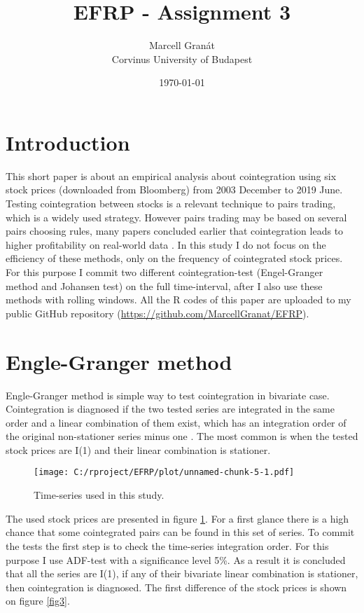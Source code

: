 \documentclass[12pt, a4paper, twoside, titlepage]{article}
\title{EFRP - Assignment 3}
\date{\today}
\author{Marcell Granát \\ Corvinus University of Budapest}
\begin{document}
  \maketitle
  \tableofcontents
  

\section{Introduction}
\setcounter{page}{1}

This short paper is about an empirical analysis about cointegration using six stock prices (downloaded from Bloomberg) from 2003 December to 2019 June. Testing cointegration between stocks is a relevant technique to pairs trading, which is a widely used strategy. However pairs trading may be based on several pairs choosing rules, many papers concluded earlier that cointegration leads to higher profitability on real-world data \cite{Huck.2014}.
In this study I do not focus on the efficiency of these methods, only on the frequency of cointegrated stock prices. For this purpose I commit two different cointegration-test (Engel-Granger method and Johansen test) on the full time-interval, after I also use these methods with rolling windows. All the R codes of this paper are uploaded to my public GitHub repository (\href{https://github.com/MarcellGranat/EFRP/blob/master/Exercise-3.md}{https://github.com/MarcellGranat/EFRP}). 

\section{Engle-Granger method}

Engle-Granger method is simple way to test cointegration in bivariate case. Cointegration is diagnosed if the two tested series are integrated in the same order and a linear combination of them exist, which has an integration order of the original non-stationer series minus one \cite{Kirchgassner.2007}.
The most common is when the tested stock prices are I(1) and their linear combination is stationer.

\begin{figure}[ht]
  \centering
  \texttt{[image: C:/rproject/EFRP/plot/unnamed-chunk-5-1.pdf]}
  \caption{Time-series used in this study.}
  \label{fig1}
\end{figure}

The used stock prices are presented in figure \ref{fig1}. For a first glance there is a high chance that some cointegrated pairs can be found in this set of series. To commit the tests the first step is to check the time-series integration order. For this purpose I use ADF-test with a significance level 5\%. As a result it is concluded that all the series are I(1), if any of their bivariate linear combination is stationer, then cointegration is diagnosed. The first difference of the stock prices is shown on figure \ref{fig3}.
\end{document}
